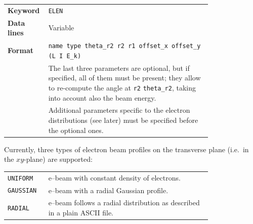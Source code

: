 \bigskip
\begin{tabular}{@{}lp{0.8\linewidth}}
    \textbf{Keyword}    & \texttt{ELEN}\index{ELEN} \\
    \textbf{Data lines} & Variable \\
    \textbf{Format}     & \texttt{name type theta\_r2 r2 r1 offset\_x offset\_y (L I E\_k) } \\
    & The last three parameters are optional, but if specified, all of them must be present; they allow to re-compute the angle at \texttt{r2} \texttt{theta\_r2}, taking into account also the beam energy.  \\
    & Additional parameters specific to the electron distributions (see later) must be specified before the optional ones. \\
\end{tabular}

\bigskip
\noindent Currently, three types of electron beam profiles on the transverse plane (i.e.~in the $xy$-plane) are supported:

\bigskip
\begin{tabular}{@{}lp{0.8\linewidth}}
    \texttt{UNIFORM}  & e--beam with constant density of electrons. \\
    \texttt{GAUSSIAN} & e--beam with a radial Gaussian profile. \\
    \texttt{RADIAL}   & e--beam follows a radial distribution as described in a plain ASCII file. \\
\end{tabular}

